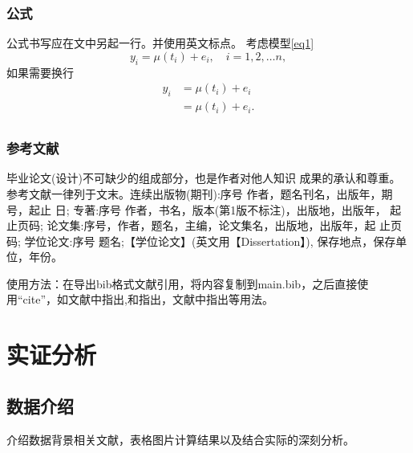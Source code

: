 \documentclass{SUFEThesis}
\begin{document}
\subsubsection{公式}
公式书写应在文中另起一行。并使用英文标点。
考虑模型\eqref{eq1}
\begin{equation}
    y_i = \mu(t_i) + e_i, \quad i = 1,2,\dots n,
    \label{eq1}
\end{equation}
如果需要换行
\begin{equation}
    \begin{aligned}
        y_i & = \mu(t_i) + e_i  \\
            & = \mu(t_i) + e_i. \\
    \end{aligned}
\end{equation}

\subsubsection{参考文献}
毕业论文(设计)不可缺少的组成部分，也是作者对他人知识
成果的承认和尊重。参考文献一律列于文末。连续出版物(期刊):序号 作者，题名刊名，出版年，期号，起止 日;
专著:序号 作者，书名，版本(第1版不标注)，出版地，出版年， 起止页码; 论文集:序号，作者，题名，主编，论文集名，出版地，出版年，起 止页码;
学位论文:序号 题名;【学位论文】(英文用【Dissertation】),
保存地点，保存单位，年份。\par
使用方法：在导出bib格式文献引用，将内容复制到main.bib，之后直接使用“cite”，如文献中指出\cite{guegan2005can},\citet{guegan2005can}和\citet{dahlhaus1997}指出，文献中指出\cite{guegan2005can,dahlhaus1997}等用法。


\section{实证分析}
\subsection{数据介绍}
介绍数据背景相关文献，表格图片计算结果以及结合实际的深刻分析。

\end{document}
